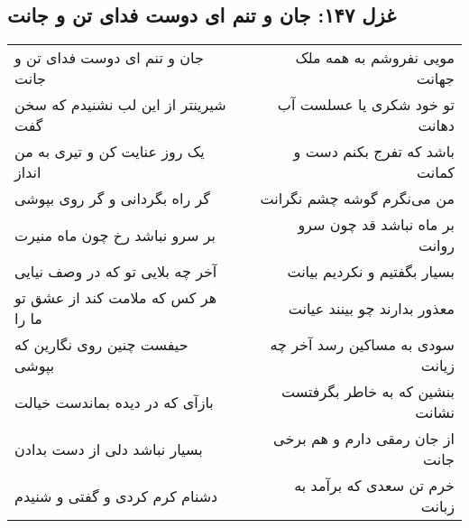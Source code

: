 \begin{center}
\section*{غزل ۱۴۷: جان و تنم ای دوست فدای تن و جانت}
\label{sec:147}
\begin{longtable}{l p{0.5cm} r}
جان و تنم ای دوست فدای تن و جانت
&&
مویی نفروشم به همه ملک جهانت
\\
شیرینتر از این لب نشنیدم که سخن گفت
&&
تو خود شکری یا عسلست آب دهانت
\\
یک روز عنایت کن و تیری به من انداز
&&
باشد که تفرج بکنم دست و کمانت
\\
گر راه بگردانی و گر روی بپوشی
&&
من می‌نگرم گوشه چشم نگرانت
\\
بر سرو نباشد رخ چون ماه منیرت
&&
بر ماه نباشد قد چون سرو روانت
\\
آخر چه بلایی تو که در وصف نیایی
&&
بسیار بگفتیم و نکردیم بیانت
\\
هر کس که ملامت کند از عشق تو ما را
&&
معذور بدارند چو بینند عیانت
\\
حیفست چنین روی نگارین که بپوشی
&&
سودی به مساکین رسد آخر چه زیانت
\\
بازآی که در دیده بماندست خیالت
&&
بنشین که به خاطر بگرفتست نشانت
\\
بسیار نباشد دلی از دست بدادن
&&
از جان رمقی دارم و هم برخی جانت
\\
دشنام کرم کردی و گفتی و شنیدم
&&
خرم تن سعدی که برآمد به زبانت
\\
\end{longtable}
\end{center}
